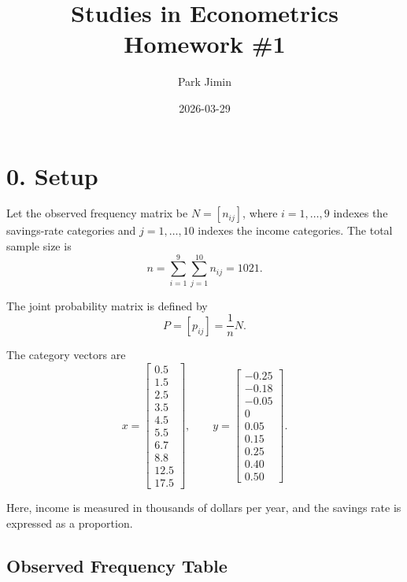 \documentclass[12pt]{article}
\title{Studies in Econometrics \\ Homework \#1}
\author{Park Jimin}
\date{2026-03-29}
\begin{document}
\maketitle

\section*{0. Setup}

Let the observed frequency matrix be $N=[n_{ij}]$, where $i=1,\dots,9$ indexes the savings-rate categories and $j=1,\dots,10$ indexes the income categories. The total sample size is
\[
n=\sum_{i=1}^{9}\sum_{j=1}^{10} n_{ij}=1021.
\]

The joint probability matrix is defined by
\[
P=[p_{ij}]=\frac{1}{n}N.
\]

The category vectors are
\[
x=
\begin{bmatrix}
0.5\\1.5\\2.5\\3.5\\4.5\\5.5\\6.7\\8.8\\12.5\\17.5
\end{bmatrix},
\qquad
y=
\begin{bmatrix}
-0.25\\-0.18\\-0.05\\0\\0.05\\0.15\\0.25\\0.40\\0.50
\end{bmatrix}.
\]

Here, income is measured in thousands of dollars per year, and the savings rate is expressed as a proportion.

\subsection*{Observed Frequency Table}
\end{document}
